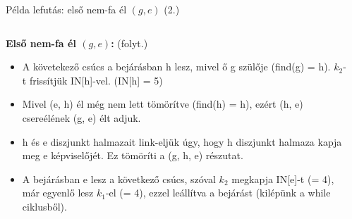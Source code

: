 \begin{frame}{Példa lefutás: első nem-fa él $(g, e)$ (2.)}
\begin{columns}[T]
  \begin{column}{0.46\textwidth}
    \small
    \textbf{Első nem-fa él $(g, e)$:} (folyt.)
    \begin{itemize}

      \item A követekező csúcs a bejárásban h lesz, mivel ő g szülője (find(g) = h). $k_2$-t frissítjük IN[h]-vel. (IN[h] = 5)
      
      \item Mivel (e, h) él még nem lett tömörítve (find(h) = h), ezért (h, e) csereélének (g, e) élt adjuk.
      
      \item h és e diszjunkt halmazait link-eljük úgy, hogy h diszjunkt halmaza kapja meg e képviselőjét. Ez tömöríti a (g, h, e) részutat.
      
      \item A bejárásban e lesz a következő csúcs, szóval $k_2$ megkapja IN[e]-t (= 4), már egyenlő lesz $k_1$-el (= 4), ezzel leállítva a bejárást (kilépünk a while ciklusből).
    \end{itemize}
  \end{column}
  \begin{column}{0.54\textwidth}
    \centering
    \begin{tikzpicture}[
      scale=1,
      vtx/.style={circle, draw=black, fill=white, inner sep=1pt, minimum size=16pt},
      mstedge/.style={line width=2.5pt, draw=black},
      otheredge/.style={line width=0.8pt, draw=black},
      font=\small
    ]


\end{tikzpicture}
\end{column}
\end{columns}
\end{frame}

